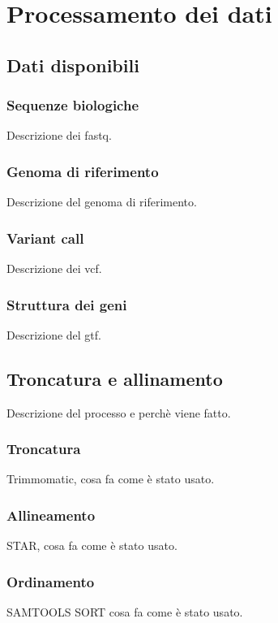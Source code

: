 \chapter{Processamento dei dati}
\label{cha:processamento}

  \section{Dati disponibili}
  \label{sec:dati}

    \subsection{Sequenze biologiche}
    \label{subsec:fastq}
    Descrizione dei fastq.

    \subsection{Genoma di riferimento}
    \label{subsec:star-gen}
    Descrizione del genoma di riferimento.

    \subsection{Variant call}
    \label{subsec:vcf}
    Descrizione dei vcf.

    \subsection{Struttura dei geni}
    \label{subsec:gtf}
    Descrizione del gtf.

  \section{Troncatura e allinamento}
  \label{sec:trimm_star}
  Descrizione del processo e perch\`e viene fatto.

    \subsection{Troncatura}
    \label{subsec:trimm}
    Trimmomatic, cosa fa come \`e stato usato.

    \subsection{Allineamento}
    \label{subsect:star}
    STAR, cosa fa come \`e stato usato.

    \subsection{Ordinamento}
    \label{subsec:sorting}
    SAMTOOLS SORT cosa fa come \`e stato usato.

